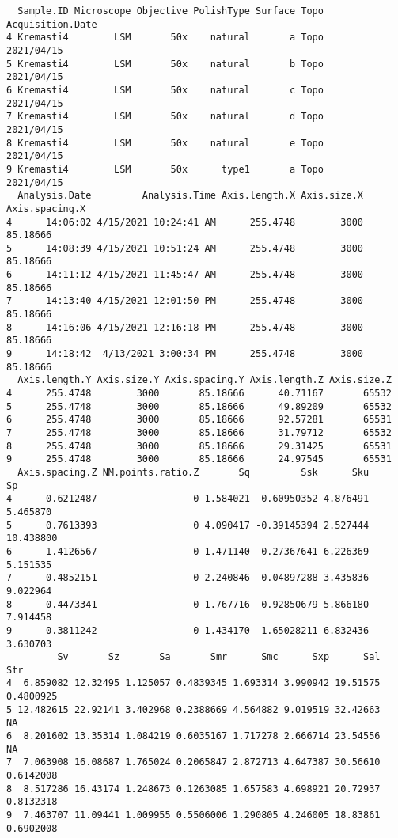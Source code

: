 \documentclass[
]{article}
\begin{document}
\begin{verbatim}
  Sample.ID Microscope Objective PolishType Surface Topo Acquisition.Date
4 Kremasti4        LSM       50x    natural       a Topo       2021/04/15
5 Kremasti4        LSM       50x    natural       b Topo       2021/04/15
6 Kremasti4        LSM       50x    natural       c Topo       2021/04/15
7 Kremasti4        LSM       50x    natural       d Topo       2021/04/15
8 Kremasti4        LSM       50x    natural       e Topo       2021/04/15
9 Kremasti4        LSM       50x      type1       a Topo       2021/04/15
  Analysis.Date         Analysis.Time Axis.length.X Axis.size.X Axis.spacing.X
4      14:06:02 4/15/2021 10:24:41 AM      255.4748        3000       85.18666
5      14:08:39 4/15/2021 10:51:24 AM      255.4748        3000       85.18666
6      14:11:12 4/15/2021 11:45:47 AM      255.4748        3000       85.18666
7      14:13:40 4/15/2021 12:01:50 PM      255.4748        3000       85.18666
8      14:16:06 4/15/2021 12:16:18 PM      255.4748        3000       85.18666
9      14:18:42  4/13/2021 3:00:34 PM      255.4748        3000       85.18666
  Axis.length.Y Axis.size.Y Axis.spacing.Y Axis.length.Z Axis.size.Z
4      255.4748        3000       85.18666      40.71167       65532
5      255.4748        3000       85.18666      49.89209       65532
6      255.4748        3000       85.18666      92.57281       65531
7      255.4748        3000       85.18666      31.79712       65532
8      255.4748        3000       85.18666      29.31425       65531
9      255.4748        3000       85.18666      24.97545       65531
  Axis.spacing.Z NM.points.ratio.Z       Sq         Ssk      Sku        Sp
4      0.6212487                 0 1.584021 -0.60950352 4.876491  5.465870
5      0.7613393                 0 4.090417 -0.39145394 2.527444 10.438800
6      1.4126567                 0 1.471140 -0.27367641 6.226369  5.151535
7      0.4852151                 0 2.240846 -0.04897288 3.435836  9.022964
8      0.4473341                 0 1.767716 -0.92850679 5.866180  7.914458
9      0.3811242                 0 1.434170 -1.65028211 6.832436  3.630703
         Sv       Sz       Sa       Smr      Smc      Sxp      Sal       Str
4  6.859082 12.32495 1.125057 0.4839345 1.693314 3.990942 19.51575 0.4800925
5 12.482615 22.92141 3.402968 0.2388669 4.564882 9.019519 32.42663        NA
6  8.201602 13.35314 1.084219 0.6035167 1.717278 2.666714 23.54556        NA
7  7.063908 16.08687 1.765024 0.2065847 2.872713 4.647387 30.56610 0.6142008
8  8.517286 16.43174 1.248673 0.1263085 1.657583 4.698921 20.72937 0.8132318
9  7.463707 11.09441 1.009955 0.5506006 1.290805 4.246005 18.83861 0.6902008

\end{verbatim}
\end{document}
